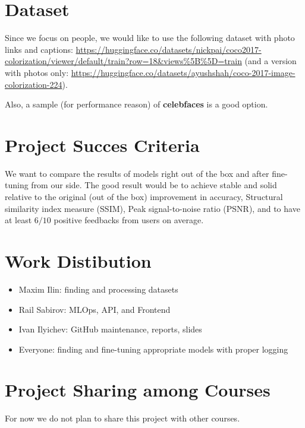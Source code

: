 \documentclass{article}
\begin{document}
\section{Dataset}
\par Since we focus on people, we would like to use the following dataset with photo links and captions: \url{https://huggingface.co/datasets/nickpai/coco2017-colorization/viewer/default/train?row=18&views%5B%5D=train} (and a version with photos only: \url{https://huggingface.co/datasets/ayushshah/coco-2017-image-colorization-224}). 
\par Also, a sample (for performance reason) of \textbf{celebfaces} is a good option.

\section{Project Succes Criteria}
\par We want to compare the results of models right out of the box and after fine-tuning from our side. The good result would be to achieve stable and solid relative to the original (out of the box) improvement in accuracy, Structural similarity index  measure (SSIM), Peak signal-to-noise ratio (PSNR), and to have at least \(6/10\) positive feedbacks from users on average.

\section{Work Distibution}
\begin{itemize}
    \item Maxim Ilin: finding and processing datasets
    \item Rail Sabirov: MLOps, API, and Frontend
    \item Ivan Ilyichev: GitHub maintenance, reports, slides
    \item Everyone: finding and fine-tuning appropriate models with proper logging
\end{itemize}

\section{Project Sharing among Courses}
\par For now we do not plan to share this project with other courses.
\end{document}
